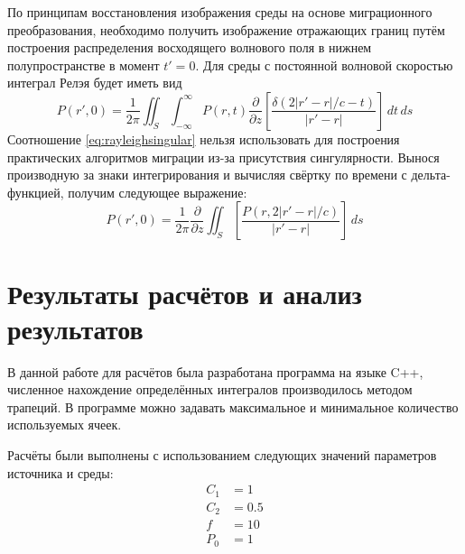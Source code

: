 \documentclass[a4paper, fontsize=14pt]{article}
\begin{document}
	По принципам восстановления изображения среды на основе миграционного преобразования, необходимо получить изображение отражающих границ путём построения распределения восходящего волнового поля в нижнем полупространстве в момент $t' = 0$. Для среды с постоянной волновой скоростью интеграл Релэя будет иметь вид
	\begin{equation}
		P(r',0) = \frac{1}{2\pi} \iint_S \int_{-\infty}^{\infty} P(r,t) \frac{\partial}{\partial z} 
		\left[ \frac{\delta(2|r'-r|/c -t)}{|r'-r|}\right]\,dt\,ds
		\label{eq:rayleighsingular}
	\end{equation}
	Соотношение \ref{eq:rayleighsingular} нельзя использовать для построения практических алгоритмов миграции из-за присутствия сингулярности. Вынося производную за знаки интегрирования и вычисляя свёртку по времени с дельта-функцией, получим следующее выражение:\cite{golubev}
	\begin{equation}
				P(r',0) = \frac{1}{2\pi}\frac{\partial}{\partial z} \iint_S   
		\left[ \frac{P(r,2|r'-r|/c)}{|r'-r|}\right]\,ds
		\label{eq:rayleighgood}
	\end{equation}
	\section{Результаты расчётов и анализ результатов}
	В данной работе для расчётов была разработана программа на языке C++, 
	численное нахождение определённых интегралов
	производилось методом трапеций. В программе можно задавать максимальное и минимальное количество используемых ячеек. 
	
	Расчёты были выполнены с использованием следующих значений параметров источника и среды:
	\begin{align*}
		C_1 &= 1 \\
		C_2 &= 0.5 \\
		f &=10 \\
		P_0 & = 1
	\end{align*}
	
\end{document}
